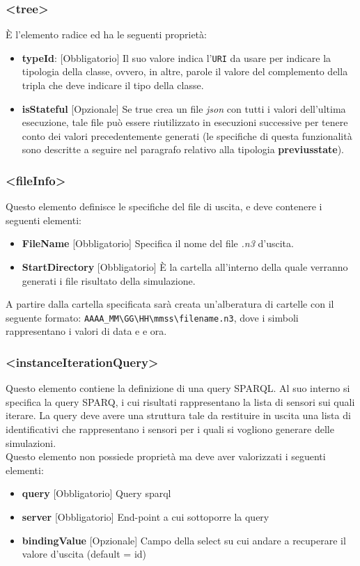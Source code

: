 \documentclass[12pt,a4paper,italian]{article}
\begin{document}
\subsubsection{<tree>}
\`E l'elemento radice ed ha le seguenti proprietà:
\begin{itemize}
	\item \textbf{typeId}: [Obbligatorio] Il suo valore indica l'\texttt{URI} da usare per indicare la tipologia della classe, ovvero, in altre, parole il valore del complemento della tripla 
	che deve indicare il tipo della classe.
	\item \textbf{isStateful} [Opzionale] Se true crea un file \emph{json} con tutti i valori dell'ultima esecuzione, tale file può essere riutilizzato in esecuzioni successive per tenere conto dei valori 
	precedentemente generati (le specifiche di questa funzionalità sono descritte a seguire nel paragrafo relativo alla tipologia \textbf{previusstate}). 
\end{itemize}
\subsubsection{<fileInfo>}\label{fileinfo}
Questo elemento definisce le specifiche del file di uscita, e deve contenere i seguenti elementi:
\begin{itemize}
	\item \textbf{FileName} [Obbligatorio] Specifica il nome del file \emph{.n3} d'uscita.
	\item \textbf{StartDirectory} [Obbligatorio] \`E la cartella all'interno della quale verranno generati i file risultato della simulazione.
\end{itemize}
A partire dalla cartella specificata sarà creata un'alberatura di cartelle con il seguente formato: \texttt{AAAA\_MM\textbackslash GG\textbackslash HH\textbackslash mmss\textbackslash filename.n3}, dove i simboli rappresentano i valori di data e e ora.


\subsubsection{<instanceIterationQuery>}
Questo elemento contiene  la definizione di una query SPARQL. Al suo interno si specifica la query SPARQ, i cui risultati rappresentano la lista di sensori sui quali iterare.
La query deve avere una struttura tale da restituire in uscita una lista di identificativi che rappresentano i sensori per i quali si vogliono generare delle simulazioni.\\
Questo elemento non possiede proprietà ma deve aver valorizzati i seguenti elementi:
\begin{itemize}
	\item \textbf{query} [Obbligatorio] Query sparql
	\item \textbf{server} [Obbligatorio] End-point a cui sottoporre la query
	\item \textbf{bindingValue} [Opzionale] Campo della select su cui andare a recuperare il valore d'uscita (default = id)
\end{itemize}
\end{document}
